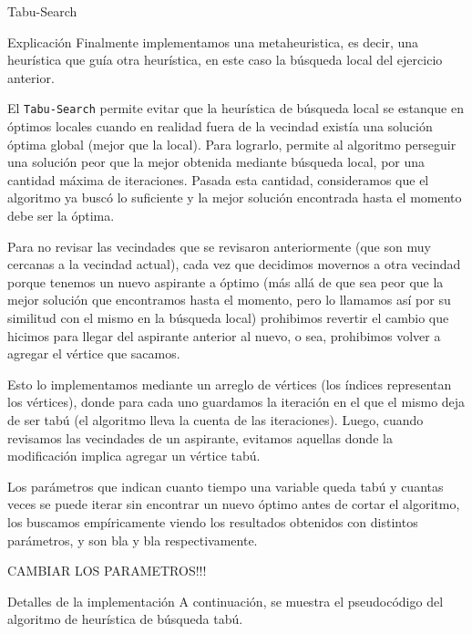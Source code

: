 \begin{section}{Tabu-Search}
	\begin{subsection}{Explicación}
		Finalmente implementamos una metaheuristica, es decir, una heurística que guía otra heurística, en este caso la búsqueda local del ejercicio anterior.

		El \texttt{Tabu-Search} permite evitar que la heurística de búsqueda local se estanque en óptimos locales cuando en realidad fuera de la vecindad existía una solución óptima global (mejor que la local).
		Para lograrlo, permite al algoritmo perseguir una solución peor que la mejor obtenida mediante búsqueda local, por una cantidad máxima de iteraciones.
		Pasada esta cantidad, consideramos que el algoritmo ya buscó lo suficiente y la mejor solución encontrada hasta el momento debe ser la óptima.

		Para no revisar las vecindades que se revisaron anteriormente (que son muy cercanas a la vecindad actual),
		cada vez que decidimos movernos a otra vecindad porque tenemos un nuevo aspirante a óptimo (más allá de que sea peor que la mejor solución que encontramos hasta el momento, pero lo llamamos así por su similitud con el mismo en la búsqueda local)
		prohibimos revertir el cambio que hicimos para llegar del aspirante anterior al nuevo, o sea, prohibimos volver a agregar el vértice que sacamos.

		Esto lo implementamos mediante un arreglo de vértices (los índices representan los vértices), donde para cada uno guardamos la iteración en el que el mismo deja de ser tabú (el algoritmo lleva la cuenta de las iteraciones).
		Luego, cuando revisamos las vecindades de un aspirante, evitamos aquellas donde la modificación implica agregar un vértice tabú.

		Los parámetros que indican cuanto tiempo una variable queda tabú y cuantas veces se puede iterar sin encontrar un nuevo óptimo antes de cortar el algoritmo, los buscamos empíricamente viendo los resultados obtenidos con distintos parámetros, y son bla y bla respectivamente.

		CAMBIAR LOS PARAMETROS!!!
	\end{subsection}
	\begin{subsection}{Detalles de la implementación}		
		A continuación, se muestra el pseudocódigo del algoritmo de heurística de búsqueda tabú.\\


\end{subsection}
\end{section}
